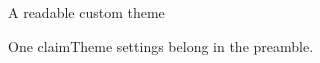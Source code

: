 \documentclass{beamer}
\begin{document}
\begin{frame}{A readable custom theme}
\begin{block}{One claim}Theme settings belong in the preamble.\end{block}
\end{frame}
\end{document}
